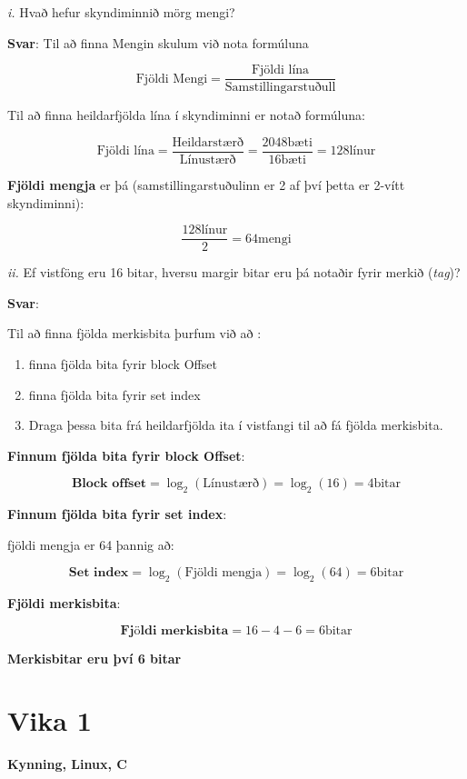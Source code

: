 \documentclass{article}
\begin{document}
\textit{i.} Hvað hefur skyndiminnið mörg
mengi? 

\textbf{Svar}:
Til að finna Mengin skulum við nota formúluna

\[ \text{Fjöldi Mengi} = \frac{\text{Fjöldi lína}}{\text{Samstillingarstuðull}} \]

Til að finna heildarfjölda lína í skyndiminni er notað formúluna:

\[ \text{Fjöldi lína} = \frac{\text{Heildarstærð}}{\text{Línustærð}} = \frac{2048 \text{bæti}}{16 \text{bæti}} = 128 \text{línur}  \]

\textbf{Fjöldi mengja} er þá (samstillingarstuðulinn er 2 af því þetta er 2-vítt skyndiminni):

\[ \frac{128 \text{línur}}{2} = 64 \text{mengi} \]

\textit{ii.} Ef vistföng eru 16 bitar, hversu margir bitar eru þá notaðir fyrir
merkið (\textit{tag})?

\textbf{Svar}:

Til að finna fjölda merkisbita þurfum við að :

\begin{enumerate}
    \item finna fjölda bita fyrir block Offset
    \item finna fjölda bita fyrir set index
    \item Draga þessa bita frá heildarfjölda ita í vistfangi til að fá fjölda merkisbita.
\end{enumerate}

\textbf{Finnum fjölda bita fyrir block Offset}:

\[\textbf{Block offset} = \log_2(\text{Línustærð}) = \log_2(16) = 4 \text{bitar}\]

\textbf{Finnum fjölda bita fyrir set index}:

fjöldi mengja er 64 þannig að:

\[\textbf{Set index} = \log_2(\text{Fjöldi mengja}) = \log_2(64) = 6 \text{bitar}\]

\textbf{Fjöldi merkisbita}:

\[\textbf{Fjöldi merkisbita} = 16 - 4 - 6 = 6 \text{bitar}\]

\textbf{Merkisbitar eru því 6 bitar}




\newpage
\section{Vika 1}
\large{\textbf{Kynning, Linux, C}}
\end{document}
